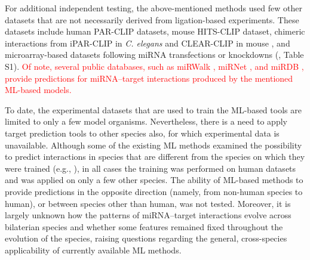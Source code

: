 \documentclass{bmcart}
\begin{document}
For additional independent testing, the above-mentioned methods used few other datasets that are not necessarily derived from ligation-based experiments. These datasets include human PAR-CLIP datasets, mouse HITS-CLIP dataset, chimeric interactions from iPAR-CLIP in \textit{C. elegans} and CLEAR-CLIP in mouse \cite{darnell_moore2015mirna}, and microarray-based datasets following miRNA transfections or knockdowns (, Table S1). 
\textcolor{red}{Of note, several public databases, such as miRWalk \cite{dweep2015mirwalk2}, miRNet \cite{chang2020mirnet}, and miRDB \cite{chen2020mirdb}, provide predictions for miRNA--target interactions produced by the mentioned ML-based models.}

To date, the experimental datasets that are used to train the ML-based tools are limited to only a few model organisms. Nevertheless, there is a need to apply target prediction tools to other species also, for which experimental data is unavailable. Although some of the existing ML methods examined the possibility to predict interactions in species that are different from the species on which they were trained (e.g., \cite{lu2016learning,ding2016tarpmir,liu2019prediction}), in all cases the training was performed on human datasets and was applied on only a few other species. The ability of ML-based methods to provide predictions in the opposite direction (namely, from non-human species to human), or between species other than human, was not tested. Moreover, it is largely unknown how the patterns of miRNA--target interactions evolve across bilaterian species and whether some features remained fixed throughout the evolution of the species, raising questions regarding the general, cross-species applicability of currently available ML methods.  
\end{document}
